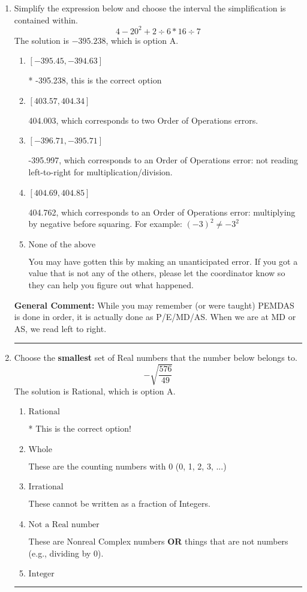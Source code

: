 \documentclass{extbook}[14pt]
\newcommand{\litem}[1]{\item #1

\rule{\textwidth}{0.4pt}}
\begin{document}
\begin{enumerate}\litem{
Simplify the expression below and choose the interval the simplification is contained within.
\[ 4 - 20^2 + 2 \div 6 * 16 \div 7 \]The solution is \( -395.238 \), which is option A.\begin{enumerate}[label=\Alph*.]
\item \( [-395.45, -394.63] \)

* -395.238, this is the correct option
\item \( [403.57, 404.34] \)

 404.003, which corresponds to two Order of Operations errors.
\item \( [-396.71, -395.71] \)

 -395.997, which corresponds to an Order of Operations error: not reading left-to-right for multiplication/division.
\item \( [404.69, 404.85] \)

 404.762, which corresponds to an Order of Operations error: multiplying by negative before squaring. For example: $(-3)^2 \neq -3^2$
\item \( \text{None of the above} \)

 You may have gotten this by making an unanticipated error. If you got a value that is not any of the others, please let the coordinator know so they can help you figure out what happened.
\end{enumerate}

\textbf{General Comment:} While you may remember (or were taught) PEMDAS is done in order, it is actually done as P/E/MD/AS. When we are at MD or AS, we read left to right.
}
\litem{
Choose the \textbf{smallest} set of Real numbers that the number below belongs to.
\[ -\sqrt{\frac{576}{49}} \]The solution is \( \text{Rational} \), which is option A.\begin{enumerate}[label=\Alph*.]
\item \( \text{Rational} \)

* This is the correct option!
\item \( \text{Whole} \)

These are the counting numbers with 0 (0, 1, 2, 3, ...)
\item \( \text{Irrational} \)

These cannot be written as a fraction of Integers.
\item \( \text{Not a Real number} \)

These are Nonreal Complex numbers \textbf{OR} things that are not numbers (e.g., dividing by 0).
\item \( \text{Integer} \)


\end{enumerate}}
\end{enumerate}
\end{document}
